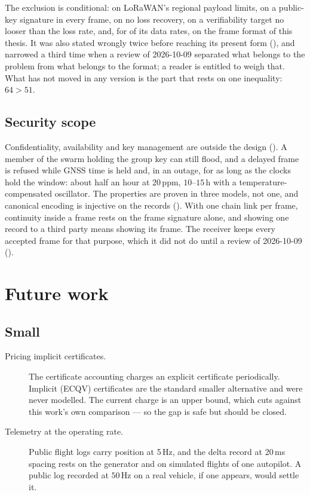 The exclusion is conditional: on LoRaWAN's regional payload limits, on a public-key signature in
every frame, on no loss recovery, on a verifiability target no looser than the loss rate, and,
for \exclFmtCount{} of its \exclCount{} data rates, on the frame format of this thesis. It was
also stated wrongly twice before reaching its present form (), and
narrowed a third time when a review of 2026-10-09 separated what belongs to the problem from
what belongs to the format; a reader is entitled to weigh that. What has not moved in any version is the part that rests on one
inequality: $64 > 51$.

\subsection{Security scope}

Confidentiality, availability and key management are outside the design (). A
member of the swarm holding the group key can still flood, and a delayed frame is refused while
GNSS time is held and, in an outage, for as long as the clocks hold the window: about half an hour
at 20\,ppm, $10$--$15$\,h with a temperature-compensated oscillator. The properties are proven in
three models, not one, and canonical encoding is injective on the records (). With one chain link per frame, continuity inside
a frame rests on the frame signature alone, and showing one record to a third party means
showing its frame. The receiver keeps every accepted frame for that purpose, which it did not
do until a review of 2026-10-09 ().

\section{Future work}

\subsection{Small}

\begin{description}
\item[Pricing implicit certificates.] The certificate accounting charges an explicit certificate
periodically. Implicit (ECQV) certificates are the standard smaller alternative and were never
modelled. The current charge is an upper bound, which cuts against this work's own comparison ---
so the gap is safe but should be closed.

\item[Telemetry at the operating rate.] Public flight logs carry position at 5\,Hz, and the
delta record at 20\,ms spacing rests on the generator and on simulated flights of one autopilot.
A public log recorded at $50$\,Hz on a real vehicle, if one appears, would settle it.
\end{description}


